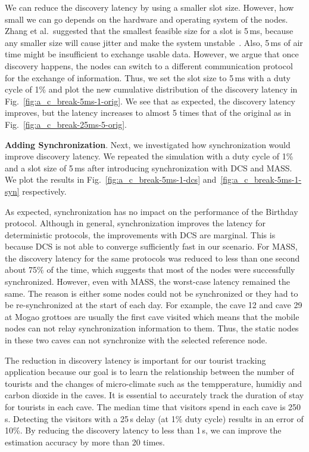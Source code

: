 \documentclass[twoside,twocolumn]{article}
\begin{document}
We can reduce the discovery latency by using a smaller slot size.
However, how small we can go depends on the hardware and operating
system of the nodes.  Zhang et al.\ suggested that the smallest
feasible size for a slot is 5\,ms, because any smaller size will cause
jitter and make the system unstable~\citep{zhang2012acc}. Also, 5\,ms
of air time might be insufficient to exchange usable data. However, we
argue that once discovery happens, the nodes can switch to a different
communication protocol for the exchange of information.  Thus, we set
the slot size to 5\,ms with a duty cycle of 1\% and plot the new
cumulative distribution of the discovery latency in
Fig.~\ref{fig:a_c_break-5ms-1-orig}. We see that as expected, the
discovery latency improves, but the latency increases to almost 5
times that of the original as in Fig.~\ref{fig:a_c_break-25ms-5-orig}.

{\bf Adding Synchronization}. Next, we investigated how
synchronization would improve discovery latency. We repeated the
simulation with a duty cycle of 1\% and a slot size of 5\,ms after
introducing synchronization with DCS and MASS. We plot the results in
Fig.~\ref{fig:a_c_break-5ms-1-dcs}
and~\ref{fig:a_c_break-5ms-1-syn} respectively.

As expected, synchronization has no impact on the performance of the
Birthday protocol. Although in general, synchronization improves the
latency for deterministic protocols, the improvements with DCS are
marginal. This is because DCS is not able to converge sufficiently
fast in our scenario. For MASS, the discovery latency for the same
protocols was reduced to less than one second about 75\% of the time,
which suggests that most of the nodes were successfully synchronized. 
However, even with MASS, the worst-case latency remained the same.
The reason is either some nodes could not be synchronized or they had 
to be re-synchronized at the start of each day. For example, the cave
12 and cave 29 at Mogao grottoes are usually the first cave visited
which means that the mobile nodes can not relay synchronization 
information to them. Thus, the static nodes in these two caves can
not synchronize with the selected reference node.

The reduction in discovery latency is important for our tourist
tracking application because our goal is to learn the relationship
between the number of tourists and the changes of micro-climate such
as the tempperature, humidiy and carbon dioxide in the caves. It is
essential to accurately track the duration of stay for tourists in 
each cave. The median time that visitors spend in each cave is 250\,s. 
Detecting the visitors with a 25\,s delay (at 1\% duty cycle) results 
in an error of 10\%. By reducing the discovery latency to less than 
1\,s, we can improve the estimation accuracy by more than 20 times.
\end{document}
